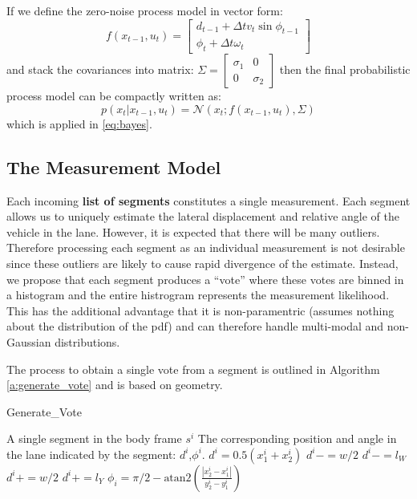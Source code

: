 \documentclass[12pt]{article}
\begin{document}
If we define the zero-noise process model in vector form:
\begin{equation}
f(x_{t-1},u_t) = \begin{bmatrix} d_{t-1}+\Delta{t}v_t\sin{\phi_{t-1}}  \\ \phi_t + \Delta{t}\omega_t \end{bmatrix}
\label{eq:f}
\end{equation}
and stack the covariances into matrix: $\Sigma = \begin{bmatrix} \sigma_1 & 0 \\ 0 & \sigma_2 \end{bmatrix}$ then the final probabilistic process model can be compactly written as:
\begin{equation}
p(x_t|x_{t-1},u_t) = \mathcal{N}\left(x_t;f(x_{t-1},u_t),\Sigma\right)
\label{eq:final_process}
\end{equation}
which is applied in \eqref{eq:bayes}.


\subsection{The Measurement Model}

Each incoming {\bf list of segments} constitutes a single measurement. Each segment allows us to uniquely estimate the lateral displacement and relative angle of the vehicle in the lane. However, it is expected that there will be many outliers. Therefore processing each segment as an individual measurement is not desirable since these outliers are likely to cause rapid divergence of the estimate. Instead, we propose that each segment produces a ``vote'' where these votes are binned in a histogram and the entire histrogram represents the measurement likelihood. This has the additional advantage that it is non-paramentric (assumes nothing about the distribution of the pdf) and can therefore handle multi-modal and non-Gaussian distributions. 

The process to obtain a single vote from a segment is outlined in Algorithm \ref{a:generate_vote} and is based on geometry. 


\begin{algorithm}[htb] %
\caption{Generate\_Vote}
\label{a:generate_vote}
\begin{algorithmic}[1]
\REQUIRE A single segment in the body frame $s^i$
\ENSURE  The corresponding position and angle in the lane indicated by the segment: $d^i$,$\phi^i$.
\STATE $d^i = 0.5(x_1^i + x_2^i)$
  \STATE $d^i -= w/2$
    \STATE $d^i -= l_W$
  \ENDIF
\ELSE
  \STATE $d^i += w/2$
    \STATE $d^i += l_Y$
  \ENDIF
\ENDIF
\STATE $\phi_i = \pi/2 - \text{atan2}\left(\frac{|x^i_2 - x^i_1|}{y^i_2-y^i_1}\right)$
\end{algorithmic}
\end{algorithm}
\end{document}
